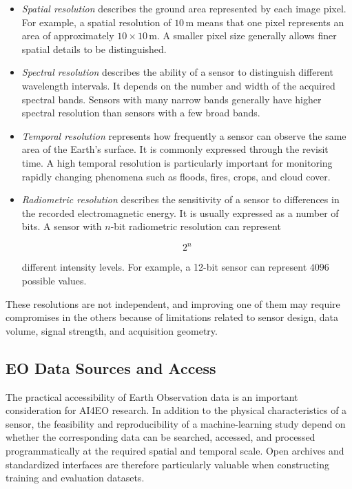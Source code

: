 \documentclass[11pt,a4paper]{article}
\begin{document}
\begin{itemize}
    \item \textit{Spatial resolution} describes the ground area represented
    by each image pixel. For example, a spatial resolution of
    \(10\,\mathrm{m}\) means that one pixel represents an area of
    approximately \(10 \times 10\,\mathrm{m}\). A smaller pixel size generally
    allows finer spatial details to be distinguished.

    \item \textit{Spectral resolution} describes the ability of a sensor to
    distinguish different wavelength intervals. It depends on the number
    and width of the acquired spectral bands. Sensors with many narrow
    bands generally have higher spectral resolution than sensors with a
    few broad bands.

    \item \textit{Temporal resolution} represents how frequently a sensor
    can observe the same area of the Earth's surface. It is commonly
    expressed through the revisit time. A high temporal resolution is
    particularly important for monitoring rapidly changing phenomena
    such as floods, fires, crops, and cloud cover.

    \item \textit{Radiometric resolution} describes the sensitivity of a
    sensor to differences in the recorded electromagnetic energy. It is
    usually expressed as a number of bits. A sensor with \(n\)-bit
    radiometric resolution can represent

    \[
    2^n
    \]

    different intensity levels. For example, a 12-bit sensor can
    represent \(4096\) possible values.
\end{itemize}

These resolutions are not independent, and improving one of them may
require compromises in the others because of limitations related to
sensor design, data volume, signal strength, and acquisition geometry.



\subsection{EO Data Sources and Access}

The practical accessibility of Earth Observation data is an important
consideration for AI4EO research. In addition to the physical
characteristics of a sensor, the feasibility and reproducibility of a
machine-learning study depend on whether the corresponding data can be
searched, accessed, and processed programmatically at the required
spatial and temporal scale. Open archives and standardized interfaces
are therefore particularly valuable when constructing training and
evaluation datasets.
\end{document}
